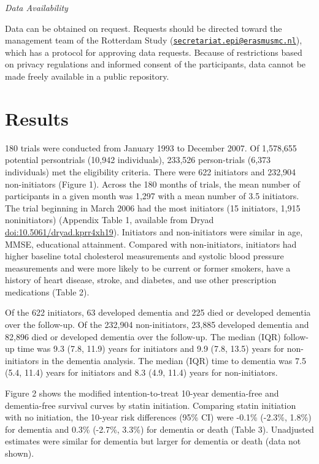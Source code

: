 \documentclass[
]{book}
\begin{document}
\emph{Data Availability}

Data can be obtained on request. Requests should be directed toward the management team of the Rotterdam Study (\href{mailto:secretariat.epi@erasmusmc.nl}{\nolinkurl{secretariat.epi@erasmusmc.nl}}), which has a protocol for approving data requests. Because of restrictions based on privacy regulations and informed consent of the participants, data cannot be made freely available in a public repository.

\hypertarget{results}{%
\section{Results}\label{results}}

180 trials were conducted from January 1993 to December 2007. Of 1,578,655 potential persontrials (10,942 individuals), 233,526 person-trials (6,373 individuals) met the eligibility criteria. There were 622 initiators and 232,904 non-initiators (Figure 1). Across the 180 months of trials, the mean number of participants in a given month was 1,297 with a mean number of 3.5 initiators. The trial beginning in March 2006 had the most initiators (15 initiators, 1,915 noninitiators) (Appendix Table 1, available from Dryad \url{doi:10.5061/dryad.kprr4xh19}). Initiators and non-initiators were similar in age, MMSE, educational attainment. Compared with non-initiators, initiators had higher baseline total cholesterol measurements and systolic blood pressure measurements and were more likely to be current or former smokers, have a history of heart disease, stroke, and diabetes, and use other prescription medications (Table 2).

Of the 622 initiators, 63 developed dementia and 225 died or developed dementia over the follow-up. Of the 232,904 non-initiators, 23,885 developed dementia and 82,896 died or developed dementia over the follow-up. The median (IQR) follow-up time was 9.3 (7.8, 11.9) years for initiators and 9.9 (7.8, 13.5) years for non-initiators in the dementia analysis. The median (IQR) time to dementia was 7.5 (5.4, 11.4) years for initiators and 8.3 (4.9, 11.4) years for non-initiators.

Figure 2 shows the modified intention-to-treat 10-year dementia-free and dementia-free survival curves by statin initiation. Comparing statin initiation with no initiation, the 10-year risk differences (95\% CI) were -0.1\% (-2.3\%, 1.8\%) for dementia and 0.3\% (-2.7\%, 3.3\%) for dementia or death (Table 3). Unadjusted estimates were similar for dementia but larger for dementia or death (data not shown).
\end{document}
